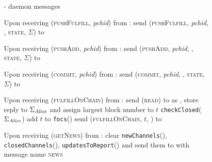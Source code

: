   \begin{figure}[H]
    \begin{systembox}{\fpaynet - daemon messages}
      \begin{algorithmic}[1]
        \State Upon receiving (\textsc{pushFulfill}, \textit{pchid}) from
        \alice:
        \Indent
          \State send (\textsc{pushFulfill}, \textit{pchid}, \alice,
          \textsc{state}, $\Sigma$) to \simulator
          \label{alg:fpaynet:daemon:fulfill}
        \EndIndent
        \Statex

        \State Upon receiving (\textsc{pushAdd}, \textit{pchid}) from \alice:
        \Indent
          \State send (\textsc{pushAdd}, \textit{pchid}, \alice, \textsc{state},
          $\Sigma$) to \simulator
          \label{alg:fpaynet:daemon:add}
        \EndIndent
        \Statex

        \State Upon receiving (\textsc{commit}, \textit{pchid}) from \alice:
        \Indent
          \State send (\textsc{commit}, \textit{pchid}, \alice, \textsc{state},
          $\Sigma$) to \simulator
          \label{alg:fpaynet:daemon:commit}
        \EndIndent
        \Statex

        \State Upon receiving (\textsc{fulfillOnChain}) from \alice:
        \Indent
          \State send (\textsc{read}) to \ledger{} as \alice{}, store reply to
          $\Sigma_{\mathit{Alice}}$ and assign largest block number to $t$
          \State \texttt{checkClosed}($\Sigma_{\mathit{Alice}}$)
          \label{alg:fpaynet:daemon:foc:read}
          \State add $t$ to \texttt{focs}(\alice)
          \State send (\textsc{fulfillOnChain}, $t$, \alice) to \simulator
        \EndIndent
        \Statex

        \State Upon receiving (\textsc{getNews}) from \alice:
        \Indent
          \State clear \texttt{newChannels}(\alice),
          \texttt{closedChannels}(\alice), \texttt{updatesToReport}(\alice) and
          send them to \alice{} with message name \textsc{news}
        \EndIndent
      \end{algorithmic}
    \end{systembox}
    \caption{}
    \label{alg:fpaynet:daemon}
  \end{figure}
